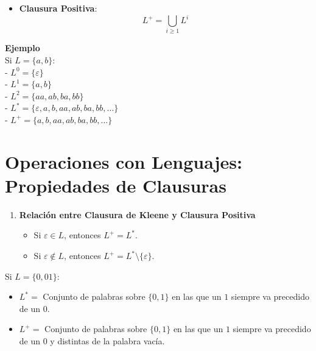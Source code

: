\documentclass[12pt]{report} %
\providecommand{\tightlist}{%
  \setlength{\itemsep}{0pt}\setlength{\parskip}{0pt}}
\begin{document}
\begin{itemize}
\tightlist
\item
  \textbf{Clausura Positiva}:\\
  \[
    L^+ = \bigcup_{i \geq 1} L^i
    \]
\end{itemize}

\textbf{Ejemplo}\\
Si \(L = \{a, b\}\):\\
- \(L^0 = \{\varepsilon\}\)\\
- \(L^1 = \{a, b\}\)\\
- \(L^2 = \{aa, ab, ba, bb\}\)\\
- \(L^* = \{\varepsilon, a, b, aa, ab, ba, bb, \ldots\}\)\\
- \(L^+ = \{a, b, aa, ab, ba, bb, \ldots\}\)

\hypertarget{operaciones-con-lenguajes-propiedades-de-clausuras}{%
\section{Operaciones con Lenguajes: Propiedades de
Clausuras}\label{operaciones-con-lenguajes-propiedades-de-clausuras}}

\begin{enumerate}
\def\labelenumi{\arabic{enumi}.}
\tightlist
\item
  \textbf{Relación entre Clausura de Kleene y Clausura Positiva}

  \begin{itemize}
  \tightlist
  \item
    Si \(\varepsilon \in L\), entonces \(L^+ = L^*\).\\
  \item
    Si \(\varepsilon \notin L\), entonces
    \(L^+ = L^* \setminus \{\varepsilon\}\).
  \end{itemize}
\end{enumerate}

\begin{ejemplo}
Si $L = \{0, 01\}$:  
    \begin{itemize}
        \item $L^* =$ Conjunto de palabras sobre $\{0, 1\}$ en las que un $1$ siempre va precedido de un $0$.  
        \item $L^+ =$ Conjunto de palabras sobre $\{0, 1\}$ en las que un $1$ siempre va precedido de un $0$ y distintas de la palabra vacía.  
    \end{itemize}
\end{ejemplo}
\end{document}

